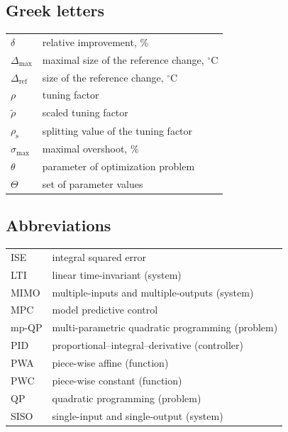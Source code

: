 \documentclass[preprint,12pt]{elsarticle}
\begin{document}
	\subsection{Greek letters}
		\begin{tabular}{ l l }
			$\delta$ & relative improvement, \% \\
			$\Delta_\mathrm{max}$ & maximal size of the reference change, $^{\circ}\mathrm{C}$  \\
			$\Delta_\mathrm{ref}$ & size of the reference change, $^{\circ}\mathrm{C}$ \\
			$\rho$ & tuning factor \\
			$\widetilde{\rho}$ & scaled tuning factor \\
			$\rho_{\mathrm{s}}$ & splitting value of the tuning factor \\
			$\sigma_{\max}$ & maximal overshoot, \% \\
			$\theta$ & parameter of optimization problem \\
			$\Theta$ & set of parameter values
		\end{tabular}
	
	\subsection*{Abbreviations}
		\begin{tabular}{ l l }
			ISE  & integral squared error \\
			LTI  & linear time-invariant (system) \\
			MIMO & multiple-inputs and multiple-outputs (system) \\
			MPC  & model predictive control \\
			mp-QP& multi-parametric quadratic programming (problem) \\
			PID  & proportional–integral–derivative (controller) \\
			PWA  & piece-wise affine (function) \\
			PWC  & piece-wise constant (function) \\
			QP   & quadratic programming (problem) \\
			SISO & single-input and single-output (system) \\
		\end{tabular}
	
\end{document}
